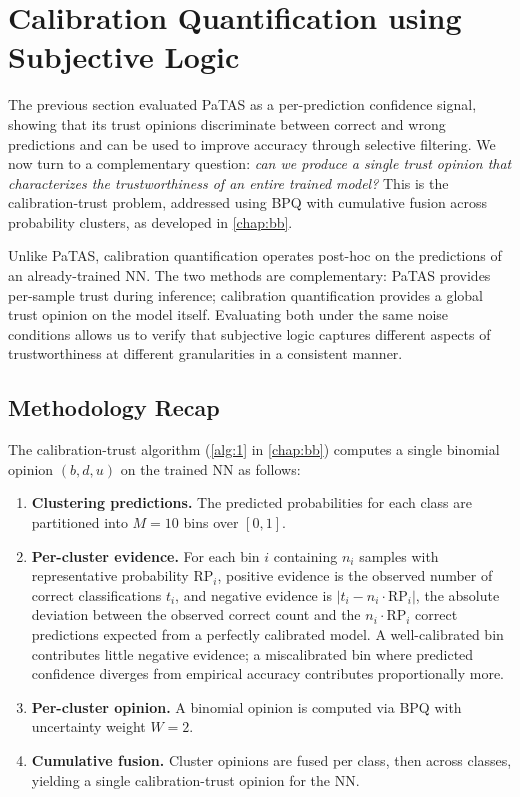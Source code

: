 \section{Calibration Quantification using Subjective Logic}
\label{sec:calibration_quantification}
The previous section evaluated \ac{PaTAS} as a per-prediction confidence signal, showing that its trust opinions discriminate between correct and wrong predictions and can be used to improve accuracy through selective filtering. We now turn to a complementary question: \emph{can we produce a single trust opinion that characterizes the trustworthiness of an entire trained model?} This is the calibration-trust problem, addressed using \acf{BPQ} with cumulative fusion across probability clusters, as developed in \cref{chap:bb}.

Unlike \ac{PaTAS}, calibration quantification operates post-hoc on the predictions of an already-trained \ac{NN}. The two methods are complementary: \ac{PaTAS} provides per-sample trust during inference; calibration quantification provides a global trust opinion on the model itself. Evaluating both under the same noise conditions allows us to verify that subjective logic captures different aspects of trustworthiness at different granularities in a consistent manner.


\subsection{Methodology Recap}
\label{sec:calibration_methodology}

The calibration-trust algorithm (\cref{alg:1} in \cref{chap:bb}) computes a single binomial opinion $(b, d, u)$ on the trained \ac{NN} as follows:

\begin{enumerate}
    \item \textbf{Clustering predictions.} The predicted probabilities for each class are partitioned into $M = 10$ bins over $[0, 1]$.
    \item \textbf{Per-cluster evidence.} For each bin $i$ containing $n_i$ samples with representative probability $\text{RP}_i$, positive evidence is the observed number of correct classifications $t_i$, and negative evidence is $|t_i - n_i \cdot \text{RP}_i|$, the absolute deviation between the observed correct count and the $n_i \cdot \text{RP}_i$ correct predictions expected from a perfectly calibrated model. A well-calibrated bin contributes little negative evidence; a miscalibrated bin where predicted confidence diverges from empirical accuracy contributes proportionally more.
    \item \textbf{Per-cluster opinion.} A binomial opinion is computed via \ac{BPQ} with uncertainty weight $W = 2$.
    \item \textbf{Cumulative fusion.} Cluster opinions are fused per class, then across classes, yielding a single calibration-trust opinion for the \ac{NN}.
\end{enumerate}

